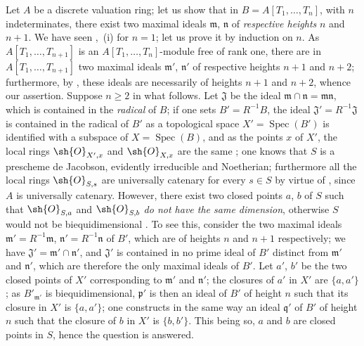 \begin{env}[10.7.3]
\label{IV.10.7.3}
Let $A$ be a discrete valuation ring; let us show that in $B=A[T_1,\ldots,T_n]$, with $n$ indeterminates, there exist two maximal ideals $\mathfrak{m}$, $\mathfrak{n}$ of \emph{respective heights} $n$ and $n+1$.
We have seen ,~(i) for $n=1$; let us prove it by induction on $n$.
As $A[T_1,\ldots,T_{n+1}]$ is an $A[T_1,\ldots,T_n]$-module free of rank one, there are in $A[T_1,\ldots,T_{n+1}]$ two maximal ideals $\mathfrak{m}'$, $\mathfrak{n}'$ of respective heights $n+1$ and $n+2$; furthermore, by , these ideals are necessarily of heights $n+1$ and $n+2$, whence our assertion.
Suppose $n\geq 2$ in what follows.
Let $\mathfrak{J}$ be the ideal $\mathfrak{m}\cap\mathfrak{n}=\mathfrak{m}\mathfrak{n}$, which is contained in the \emph{radical} of $B$; if one sets $B'=R^{-1}B$, the ideal $\mathfrak{J}'=R^{-1}\mathfrak{J}$ is contained in the radical of $B'$ as a topological space $X'=\operatorname{Spec}(B')$ is identified with a subspace of $X=\operatorname{Spec}(B)$, and as the points $x$ of $X'$, the local rings $\sh{O}_{X',x}$ and $\sh{O}_{X,x}$ are the same ; one knows  that $S$ is a prescheme de Jacobson, evidently irreducible and Noetherian; furthermore all the local rings $\sh{O}_{S,s}$ are universally catenary for every $s\in S$ by virtue of , since $A$ is universally catenary.
However, there exist two closed points $a$, $b$ of $S$ such that $\sh{O}_{S,a}$ and $\sh{O}_{S,b}$ \emph{do not have the same dimension}, otherwise $S$ would not be biequidimensional .
To see this, consider the two maximal ideals $\mathfrak{m}'=R^{-1}\mathfrak{m}$, $\mathfrak{n}'=R^{-1}\mathfrak{n}$ of $B'$, which are of heights $n$ and $n+1$ respectively; we have $\mathfrak{J}'=\mathfrak{m}'\cap\mathfrak{n}'$, and $\mathfrak{J}'$ is contained in no prime ideal of $B'$ distinct from $\mathfrak{m}'$ and $\mathfrak{n}'$, which are therefore the only maximal ideals of $B'$.
Let $a'$, $b'$ be the two closed points of $X'$ corresponding to $\mathfrak{m}'$ and $\mathfrak{n}'$; the closures of $a'$ in $X'$ are $\{a,a'\}$; as $B'_{\mathfrak{m}'}$ is biequidimensional, $\mathfrak{p}'$ is then an ideal of $B'$ of height $n$ such that its closure in $X'$ is $\{a,a'\}$; one constructs in the same way an ideal $\mathfrak{q}'$ of $B'$ of height $n$ such that the closure of $b$ in $X'$ is $\{b,b'\}$.
This being so, $a$ and $b$ are closed points in $S$, hence the question is answered.
\end{env}

